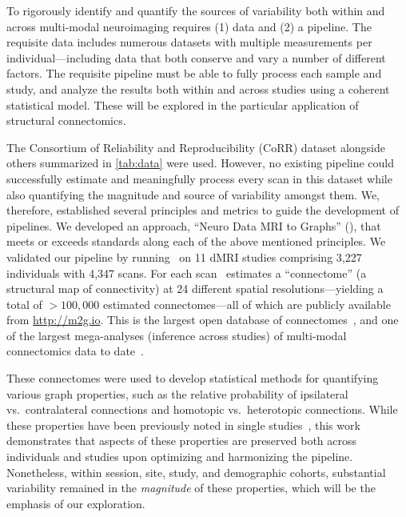 \documentclass[11pt]{article}
\begin{document}
\begin{multicols}{2}
To rigorously identify and quantify the sources of variability both within and across  multi-modal neuroimaging  requires (1) data and (2) a pipeline.
The requisite data includes numerous datasets with multiple measurements per individual---including data that both conserve and vary a number of different factors.
The requisite pipeline must be able to fully process each sample and study, and analyze the results both within and across studies using a coherent statistical model.
These will be explored in the particular application of structural connectomics.

The Consortium of Reliability and Reproducibility (CoRR) dataset alongside others summarized in \ref{tab:data} were used. 
However, no existing pipeline could successfully estimate and meaningfully process every scan in this dataset while also quantifying the magnitude and source of variability amongst them.
We, therefore, established several principles and metrics to guide the development of pipelines.
We developed an approach, ``Neuro Data MRI to Graphs'' (\ndmg), that meets or exceeds standards along each of the above mentioned principles.
We validated our pipeline by running \ndmg~on 11 dMRI studies comprising 3,227 individuals with 4,347 scans.
For each scan \ndmg~estimates  a ``connectome'' (a structural map of connectivity) at 24 different spatial resolutions---yielding a total of  $>100,000$ estimated connectomes---all of which are publicly available from \url{http://m2g.io}.
This is the largest open database of connectomes~\cite{brown2016connected}, and one of the largest mega-analyses (inference across studies) of multi-modal connectomics data to date~\cite{varoquaux2013learning, vidaurre2017discovering}. 

These connectomes were used to develop statistical methods for quantifying various graph properties, such as the relative probability of ipsilateral vs.~contralateral connections and homotopic vs.~heterotopic connections.
While these properties have been previously noted in single studies~\cite{Stark2008,Zuo2010,Gee2011}, this work demonstrates that aspects of these properties are preserved both across individuals and studies upon optimizing and harmonizing the pipeline.
Nonetheless, within session, site, study, and demographic cohorts, substantial variability remained in the \emph{magnitude} of these properties, which will be the emphasis of our exploration.


\end{multicols}
\end{document}
